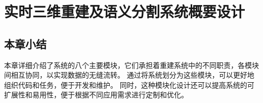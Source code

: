 
\chapter{实时三维重建及语义分割系统概要设计}



\section{本章小结}
\par 本章详细介绍了系统的八个主要模块，它们承担着重建系统中的不同职责，各模块间相互协同，以实现数据的无缝流转。
通过将系统划分为这些模块，可以更好地组织代码和任务，便于开发和维护。
同时，这种模块化设计还可以提高系统的可扩展性和易用性，便于根据不同应用需求进行定制和优化。